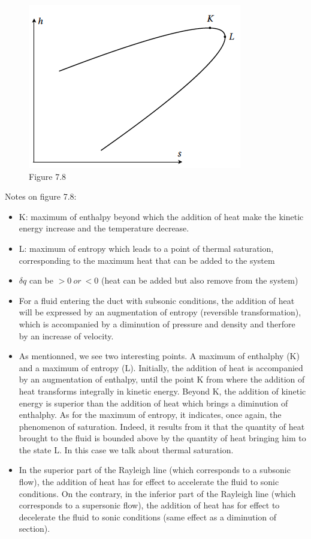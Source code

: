 \begin{figure}[H]
\begin{center}
\includegraphics[scale=0.45]{ch7/chap78.png}
\caption*{Figure 7.8}
\end{center}
\end{figure}
Notes on figure 7.8:
\begin{itemize}
\item K: maximum of enthalpy beyond which the addition of heat make the kinetic energy increase and the temperature decrease.
\item L: maximum of entropy which leads to a point of thermal saturation, corresponding to the maximum heat that can be added to the system
\item $\delta q$ can be $>0\ or\ <0$ (heat can be added but also remove from the system)
\item For a fluid entering the duct with subsonic conditions, the addition of heat will be expressed by an augmentation of entropy (reversible transformation), which is accompanied by a diminution of pressure and density and therfore by an increase of velocity.
\item As mentionned, we see two interesting points. A maximum of enthalphy (K) and a maximum of entropy (L). Initially, the addition of heat is accompanied by an augmentation of enthalpy, until the point K from where the addition of heat transforms integrally in kinetic energy. Beyond K, the addition of kinetic energy is superior than the addition of heat which brings a diminution of enthalphy. As for the maximum of entropy, it indicates, once again, the phenomenon of saturation. Indeed, it results from it that the quantity of heat brought to the fluid is bounded above by the quantity of heat bringing him to the state L. In this case we talk about thermal saturation.
\item In the superior part of the Rayleigh line (which corresponds to a subsonic flow), the addition of heat has for effect to accelerate the fluid to sonic conditions. On the contrary, in the inferior part of the Rayleigh line (which corresponds to a supersonic flow), the addition of heat has for effect to decelerate the fluid to sonic conditions (same effect as a diminution of section). 
\\

\end{itemize}

